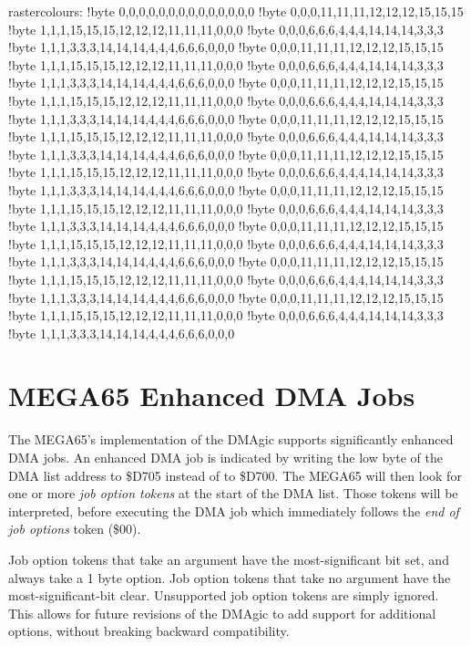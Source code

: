\begin{asmcode}
rastercolours:
  !byte 0,0,0,0,0,0,0,0,0,0,0,0,0,0
  !byte 0,0,0,11,11,11,12,12,12,15,15,15
  !byte 1,1,1,15,15,15,12,12,12,11,11,11,0,0,0
  !byte 0,0,0,6,6,6,4,4,4,14,14,14,3,3,3
  !byte 1,1,1,3,3,3,14,14,14,4,4,4,6,6,6,0,0,0
  !byte 0,0,0,11,11,11,12,12,12,15,15,15
  !byte 1,1,1,15,15,15,12,12,12,11,11,11,0,0,0
  !byte 0,0,0,6,6,6,4,4,4,14,14,14,3,3,3
  !byte 1,1,1,3,3,3,14,14,14,4,4,4,6,6,6,0,0,0
  !byte 0,0,0,11,11,11,12,12,12,15,15,15
  !byte 1,1,1,15,15,15,12,12,12,11,11,11,0,0,0
  !byte 0,0,0,6,6,6,4,4,4,14,14,14,3,3,3
  !byte 1,1,1,3,3,3,14,14,14,4,4,4,6,6,6,0,0,0
  !byte 0,0,0,11,11,11,12,12,12,15,15,15
  !byte 1,1,1,15,15,15,12,12,12,11,11,11,0,0,0
  !byte 0,0,0,6,6,6,4,4,4,14,14,14,3,3,3
  !byte 1,1,1,3,3,3,14,14,14,4,4,4,6,6,6,0,0,0
  !byte 0,0,0,11,11,11,12,12,12,15,15,15
  !byte 1,1,1,15,15,15,12,12,12,11,11,11,0,0,0
  !byte 0,0,0,6,6,6,4,4,4,14,14,14,3,3,3
  !byte 1,1,1,3,3,3,14,14,14,4,4,4,6,6,6,0,0,0
  !byte 0,0,0,11,11,11,12,12,12,15,15,15
  !byte 1,1,1,15,15,15,12,12,12,11,11,11,0,0,0
  !byte 0,0,0,6,6,6,4,4,4,14,14,14,3,3,3
  !byte 1,1,1,3,3,3,14,14,14,4,4,4,6,6,6,0,0,0
  !byte 0,0,0,11,11,11,12,12,12,15,15,15
  !byte 1,1,1,15,15,15,12,12,12,11,11,11,0,0,0
  !byte 0,0,0,6,6,6,4,4,4,14,14,14,3,3,3
  !byte 1,1,1,3,3,3,14,14,14,4,4,4,6,6,6,0,0,0
  !byte 0,0,0,11,11,11,12,12,12,15,15,15
  !byte 1,1,1,15,15,15,12,12,12,11,11,11,0,0,0
  !byte 0,0,0,6,6,6,4,4,4,14,14,14,3,3,3
  !byte 1,1,1,3,3,3,14,14,14,4,4,4,6,6,6,0,0,0
  !byte 0,0,0,11,11,11,12,12,12,15,15,15
  !byte 1,1,1,15,15,15,12,12,12,11,11,11,0,0,0
  !byte 0,0,0,6,6,6,4,4,4,14,14,14,3,3,3
  !byte 1,1,1,3,3,3,14,14,14,4,4,4,6,6,6,0,0,0
\end{asmcode}

\section{MEGA65 Enhanced DMA Jobs}

The MEGA65's implementation of the DMAgic supports significantly
enhanced DMA jobs.  An enhanced DMA job is indicated by writing the
low byte of the DMA list address to \$D705 instead of to \$D700.  The
MEGA65 will then look for one or more {\em job option tokens} at the
start of the DMA list.  Those tokens will be interpreted, before
executing the DMA job which immediately follows the {\em end of job
  options} token (\$00).

Job option tokens that take an argument have the
most-significant bit set, and always take a 1 byte option.  Job option
tokens that take no argument have the most-significant-bit clear.
Unsupported job option tokens are simply ignored.
This allows for future revisions of the DMAgic to add support for
additional options, without breaking backward compatibility.

